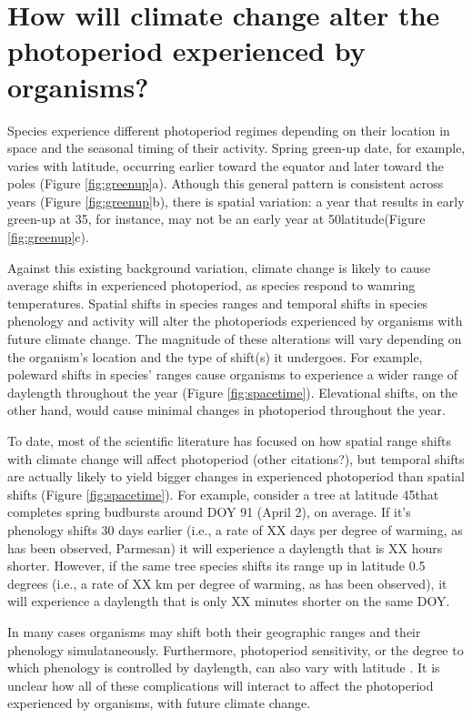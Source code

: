 \documentclass{article}
\begin{document}
\section*{How will climate change alter the photoperiod experienced by organisms?}
\par Species experience different photoperiod regimes depending on their location in space and the seasonal timing of their activity. Spring green-up date, for example, varies with latitude, occurring earlier toward the equator and later toward the poles (Figure \ref{fig:greenup}a). Athough this general pattern is consistent across years (Figure \ref{fig:greenup}b), there is spatial variation: a year that results in early green-up at 35\degree, for instance, may not be an early year at 50\degree latitude(Figure \ref{fig:greenup}c).
\par Against this existing background variation, climate change is likely to cause average shifts in experienced photoperiod, as species respond to wamring temperatures. Spatial shifts in species ranges and temporal shifts in species phenology and activity will alter the photoperiods experienced by organisms with future climate change. The magnitude of these alterations will vary depending on the organism's location and the type of shift(s) it undergoes. For example, poleward shifts in species' ranges cause organisms to experience a wider range of daylength throughout the year (Figure \ref{fig:spacetime}). Elevational shifts, on the other hand, would cause minimal changes in photoperiod throughout the year. 
\par To date, most of the scientific literature has focused on how spatial range shifts with climate change will affect photoperiod \citep{saikkonen2012} (other citations?), but temporal shifts are actually likely to yield bigger changes in experienced photoperiod than spatial shifts (Figure \ref{fig:spacetime}). For example, consider a tree at latitude 45\degree that completes spring budbursts around DOY 91 (April 2), on average. If it's phenology shifts 30 days earlier (i.e., a rate of XX days per degree of warming, as has been observed, Parmesan) it will experience a daylength that is XX hours shorter. However, if the same tree species shifts its range up in latitude 0.5 degrees (i.e., a rate of XX km per degree of warming, as has been observed), it will experience a daylength that is only XX minutes shorter on the same DOY. 

\par In many cases organisms may shift both their geographic ranges and their phenology simulataneously.  Furthermore, photoperiod sensitivity, or the degree to which phenology is controlled by daylength, can also vary with latitude \citep{Howe:1996,saikkonen2012,Partanen:2005aa,Vihera-Aarnio:2006aa,Caffarra:2011b,gauzere2017}. It is unclear how all of these complications will interact to affect the photoperiod experienced by organisms, with future climate change.
\end{document}
